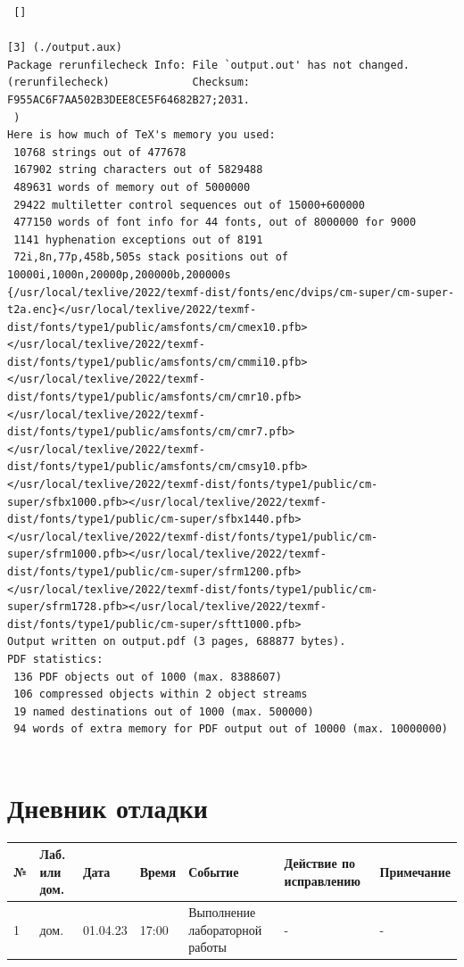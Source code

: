 \documentclass{article}
\begin{document}
\begin{verbatim}
 []

[3] (./output.aux)
Package rerunfilecheck Info: File `output.out' has not changed.
(rerunfilecheck)             Checksum: F955AC6F7AA502B3DEE8CE5F64682B27;2031.
 ) 
Here is how much of TeX's memory you used:
 10768 strings out of 477678
 167902 string characters out of 5829488
 489631 words of memory out of 5000000
 29422 multiletter control sequences out of 15000+600000
 477150 words of font info for 44 fonts, out of 8000000 for 9000
 1141 hyphenation exceptions out of 8191
 72i,8n,77p,458b,505s stack positions out of 10000i,1000n,20000p,200000b,200000s
{/usr/local/texlive/2022/texmf-dist/fonts/enc/dvips/cm-super/cm-super-t2a.enc}</usr/local/texlive/2022/texmf-dist/fonts/type1/public/amsfonts/cm/cmex10.pfb></usr/local/texlive/2022/texmf-dist/fonts/type1/public/amsfonts/cm/cmmi10.pfb></usr/local/texlive/2022/texmf-dist/fonts/type1/public/amsfonts/cm/cmr10.pfb></usr/local/texlive/2022/texmf-dist/fonts/type1/public/amsfonts/cm/cmr7.pfb></usr/local/texlive/2022/texmf-dist/fonts/type1/public/amsfonts/cm/cmsy10.pfb></usr/local/texlive/2022/texmf-dist/fonts/type1/public/cm-super/sfbx1000.pfb></usr/local/texlive/2022/texmf-dist/fonts/type1/public/cm-super/sfbx1440.pfb></usr/local/texlive/2022/texmf-dist/fonts/type1/public/cm-super/sfrm1000.pfb></usr/local/texlive/2022/texmf-dist/fonts/type1/public/cm-super/sfrm1200.pfb></usr/local/texlive/2022/texmf-dist/fonts/type1/public/cm-super/sfrm1728.pfb></usr/local/texlive/2022/texmf-dist/fonts/type1/public/cm-super/sftt1000.pfb>
Output written on output.pdf (3 pages, 688877 bytes).
PDF statistics:
 136 PDF objects out of 1000 (max. 8388607)
 106 compressed objects within 2 object streams
 19 named destinations out of 1000 (max. 500000)
 94 words of extra memory for PDF output out of 10000 (max. 10000000)


\end{verbatim}

\section{Дневник отладки}
\begin{center}
        \begin{tabularx}{\linewidth}{|X|X|X|X|X|X|X|}
            \hline
             № & Лаб. или дом. & Дата & Время & Событие & Действие по исправлению & Примечание \\
             \hline
             1 & дом. & 01.04.23 & 17:00 & Выполнение лабораторной работы & - & - \\
             \hline
    \end{tabularx}
\end{center}
\end{document}
